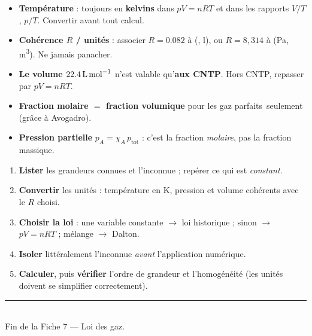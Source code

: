 \documentclass[11pt,a4paper]{article}
\newcommand{\GP}{gaz parfaits}
\begin{document}
\begin{tcolorbox}[boxbase,colback=attncol!6,colframe=attncol,
   title={\textsc{Mémo — les pièges classiques à éviter}}]
\begin{itemize}[leftmargin=1.6em,topsep=2pt,itemsep=1.5pt]
  \item \textbf{Température} : toujours en \textbf{kelvins} dans $pV=nRT$ et dans les rapports $V/T$, $p/T$. Convertir avant tout calcul.
  \item \textbf{Cohérence $R$ / unités} : associer $R=\num{0,082}$ à (\si{\atm}, \si{\litre}), ou $R=8{,}314$ à (\si{\pascal}, \si{\meter\cubed}). Ne jamais panacher.
  \item \textbf{Le volume $\qty{22{,}4}{\litre\per\mole}$} n'est valable qu'\textbf{aux CNTP}. Hors CNTP, repasser par $pV=nRT$.
  \item \textbf{Fraction molaire $=$ fraction volumique} pour les \GP\ seulement (grâce à Avogadro).
  \item \textbf{Pression partielle} $p_A=\chi_A\,p_{\text{tot}}$ : c'est la fraction \emph{molaire}, pas la fraction massique.
\end{itemize}
\end{tcolorbox}

\begin{tcolorbox}[boxbase,colback=methcol!8,colframe=methcol,sharp corners,
   title={\textsc{Méthode générale — résoudre un problème de gaz}}]
\begin{enumerate}[leftmargin=1.8em,topsep=2pt,itemsep=2pt]
  \item \textbf{Lister} les grandeurs connues et l'inconnue ; repérer ce qui est \emph{constant}.
  \item \textbf{Convertir} les unités : température en \si{\kelvin}, pression et volume cohérents avec le $R$ choisi.
  \item \textbf{Choisir la loi} : une variable constante $\to$ loi historique ; sinon $\to$ $pV=nRT$ ; mélange $\to$ Dalton.
  \item \textbf{Isoler} littéralement l'inconnue \emph{avant} l'application numérique.
  \item \textbf{Calculer}, puis \textbf{vérifier} l'ordre de grandeur et l'homogénéité (les unités doivent se simplifier correctement).
\end{enumerate}
\end{tcolorbox}

\vfill
\begin{center}
\textcolor{primary}{\rule{0.5\textwidth}{1pt}}\\[4pt]
{\small\color{black!60}Fin de la Fiche 7 — Loi des gaz.}
\end{center}
\end{document}
